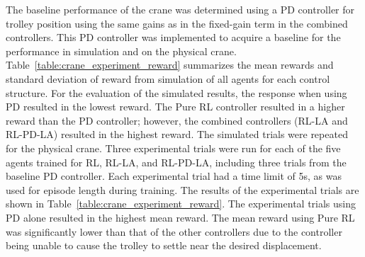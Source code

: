 The baseline performance of the crane was determined using a PD controller for trolley position using the same gains as in the fixed-gain term in the combined controllers. This PD controller was implemented to acquire a baseline for the performance in simulation and on the physical crane. Table~\ref{table:crane_experiment_reward} summarizes the mean rewards and standard deviation of reward from simulation of all agents for each control structure.
For the evaluation of the simulated results, the response when using PD resulted in the lowest reward.
The Pure RL controller resulted in a higher reward than the PD controller; however,
the combined controllers (RL-LA and RL-PD-LA) resulted in the highest reward.
%
The simulated trials
were repeated for the physical crane. Three experimental trials were run for each of the five agents trained for RL, RL-LA, and RL-PD-LA, including three trials from the baseline PD controller. Each experimental trial had a time limit of 5\si{\second}, as was used for episode length during training. The results of the experimental trials are shown in Table~\ref{table:crane_experiment_reward}. The experimental trials using PD alone resulted in the highest mean reward. The mean reward using Pure RL was significantly lower than that of the other controllers due to the controller being unable to cause the trolley to settle near the desired displacement.
%
